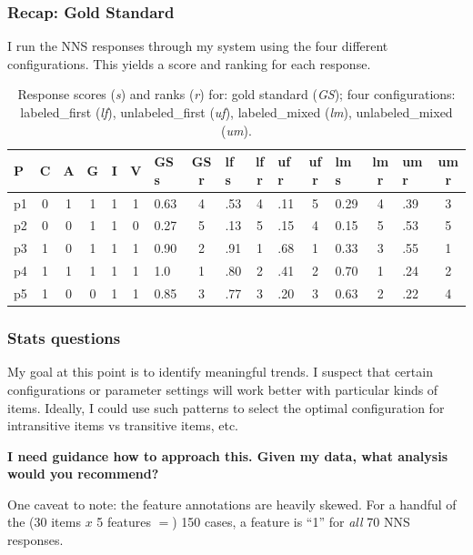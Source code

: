 \documentclass[xcolor={dvipsnames}]{beamer}
\begin{document}
\begin{frame}
\frametitle{Recap: Gold Standard}
\scriptsize
I run the NNS responses through my system using the four different configurations. This yields a score and ranking for each response.
\begingroup
\setlength{\tabcolsep}{4pt} %
\begin{table}
\tiny
\begin{center}
\begin{tabular}{|l||c|c|c|c|c||l|c||l|c||l|c||l|c||l|c|}
\hline
P & C & A & G & I & V & \tiny{GS s} & \tiny{GS r} & \tiny{lf s} & \tiny{lf r} & \tiny{uf r} & \tiny{uf r} & \tiny{lm s} & \tiny{lm r} & \tiny{um r} & \tiny{um r} \\
\hline
p1 & 0 & 1 & 1 & 1 & 1 & 0.63 & 4 & .53 & 4 & .11 & 5 & 0.29 & 4 & .39 & 3 \\
\hline
p2 & 0 & 0 & 1 & 1 & 0 & 0.27 & 5 & .13 & 5 & .15 & 4 & 0.15 & 5 & .53 & 5 \\
\hline
p3 & 1 & 0 & 1 & 1 & 1 & 0.90 & 2 & .91 & 1 & .68 & 1 & 0.33 & 3 & .55 & 1 \\
\hline
p4 & 1 & 1 & 1 & 1 & 1 & 1.0 & 1 & .80 & 2 & .41 & 2 & 0.70 & 1 & .24 & 2 \\
\hline
p5 & 1 & 0 & 0 & 1 & 1 & 0.85 & 3 & .77 & 3 & .20 & 3 & 0.63 & 2 & .22 & 4 \\
\hline
\end{tabular}
\caption{\label{tab:modelranks} \scriptsize Response scores (\textit{s}) and ranks (\textit{r}) for: gold standard (\textit{GS}); four configurations: labeled\_first (\textit{lf}), unlabeled\_first (\textit{uf}), labeled\_mixed (\textit{lm}), unlabeled\_mixed (\textit{um}).}
\end{center}
\end{table}
\endgroup
\end{frame}

\begin{frame}
\frametitle{Stats questions}
\small
My goal at this point is to identify meaningful trends. I suspect that certain configurations or parameter settings will work better with particular kinds of items. Ideally, I could use such patterns to select the optimal configuration for intransitive items vs transitive items, etc.

\bigskip
\textbf{I need guidance how to approach this. Given my data, what analysis would you recommend?}

\bigskip
One caveat to note: the feature annotations are heavily skewed. For a handful of the (30 items $x$ 5 features $=$) 150 cases, a feature is ``1'' for \textit{all} 70 NNS responses.

\end{frame}
\end{document}
